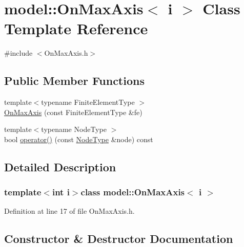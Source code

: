 \hypertarget{classmodel_1_1_on_max_axis}{}\section{model\+:\+:On\+Max\+Axis$<$ i $>$ Class Template Reference}
\label{classmodel_1_1_on_max_axis}


{\ttfamily \#include $<$On\+Max\+Axis.\+h$>$}

\subsection*{Public Member Functions}
\begin{DoxyCompactItemize}
\item 
{\footnotesize template$<$typename Finite\+Element\+Type $>$ }\\\hyperlink{classmodel_1_1_on_max_axis_a37f6cf94d2108a43afb889a4a0db5b9a}{On\+Max\+Axis} (const Finite\+Element\+Type \&fe)
\item 
{\footnotesize template$<$typename Node\+Type $>$ }\\bool \hyperlink{classmodel_1_1_on_max_axis_acce95b078e231a94c74805829f216ca1}{operator()} (const \hyperlink{_network_typedefs_8h_a723f680c66f6a92647827790bcbafce0}{Node\+Type} \&node) const 
\end{DoxyCompactItemize}


\subsection{Detailed Description}
\subsubsection*{template$<$int i$>$class model\+::\+On\+Max\+Axis$<$ i $>$}



Definition at line 17 of file On\+Max\+Axis.\+h.



\subsection{Constructor \& Destructor Documentation}
\hypertarget{classmodel_1_1_on_max_axis_a37f6cf94d2108a43afb889a4a0db5b9a}{}
